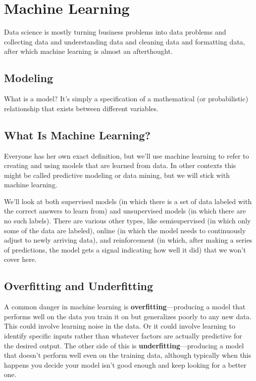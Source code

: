 \chapter{Machine Learning}
Data science is mostly turning business problems into data problems and collecting
data and understanding data and cleaning data and formatting data, after which
machine learning is almost an afterthought.
\section{Modeling}

What is a model? It's simply a specification of a mathematical (or probabilistic) relationship that exists between different variables.

\section{What Is Machine Learning?}

Everyone has her own exact definition, but we'll use machine learning to refer to creating and using models that are learned from data. In other contexts this might be
called predictive modeling or data mining, but we will stick with machine learning.

We'll look at both supervised models (in which there is a set of data labeled with the
correct answers to learn from) and unsupervised models (in which there are no such
labels). There are various other types, like semisupervised (in which only some of the
data are labeled), online (in which the model needs to continuously adjust to newly
arriving data), and reinforcement (in which, after making a series of predictions, the
model gets a signal indicating how well it did) that we won't cover here.

\section{Overfitting and Underfitting}
A common danger in machine learning is \textbf{overfitting}—producing a model that performs well on the data you train it on but generalizes poorly to any new data. This
could involve learning noise in the data. Or it could involve learning to identify specific inputs rather than whatever factors are actually predictive for the desired output.
The other side of this is \textbf{underfitting}—producing a model that doesn't perform well
even on the training data, although typically when this happens you decide your
model isn't good enough and keep looking for a better one.

